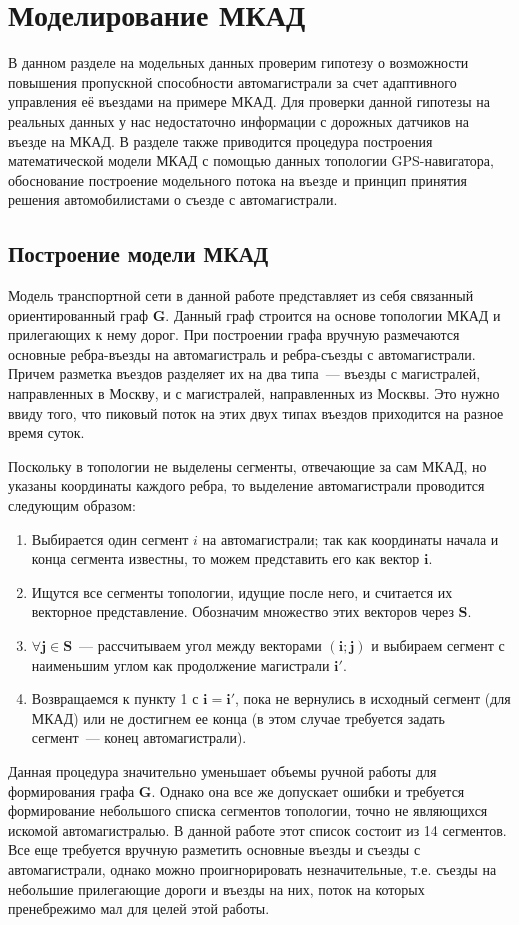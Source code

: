 \chapter{Моделирование МКАД}\label{sec:ch5}
В данном разделе на модельных данных проверим гипотезу о возможности повышения пропускной способности автомагистрали за счет адаптивного управления её въездами на примере МКАД.
Для проверки данной гипотезы на реальных данных у нас недостаточно информации с дорожных датчиков на въезде на МКАД.
В разделе также приводится процедура построения математической модели МКАД с помощью данных топологии GPS-навигатора, обоснование построение модельного потока на въезде и принцип принятия решения автомобилистами о съезде с автомагистрали.

\section{Построение модели МКАД}
\label{sec:MCAR_model}
Модель транспортной сети в данной работе представляет из себя связанный ориентированный граф \(\mathbf{G}\).
Данный граф строится на основе топологии МКАД и прилегающих к нему дорог.
При построении графа вручную размечаются основные ребра-въезды на автомагистраль и ребра-съезды с автомагистрали.
Причем разметка въездов разделяет их на два типа~--- въезды с магистралей, направленных в Москву, и с магистралей, направленных из Москвы.
Это нужно ввиду того, что пиковый поток на этих двух типах въездов приходится на разное время суток.

Поскольку в топологии не выделены сегменты, отвечающие за сам МКАД, но указаны координаты каждого ребра, то выделение автомагистрали проводится следующим образом:
\begin{enumerate}
  \item Выбирается один сегмент \(i\) на автомагистрали; так как координаты начала и конца сегмента известны, то можем представить его как вектор \(\mathbf{i}\).
  \item Ищутся все сегменты топологии, идущие после него, и считается их векторное представление. Обозначим множество этих векторов через \(\mathbf{S}\).
  \item \(\forall \mathbf{j} \in \mathbf{S}\)~--- рассчитываем угол между векторами \((\mathbf{i}; \mathbf{j})\) и выбираем сегмент с наименьшим углом как продолжение магистрали \(\mathbf{i'}\).
  \item Возвращаемся к пункту 1 с \(\mathbf{i} = \mathbf{i'}\), пока не вернулись в исходный сегмент (для МКАД) или не достигнем ее конца (в этом случае требуется задать сегмент~--- конец автомагистрали).
\end{enumerate}
Данная процедура значительно уменьшает объемы ручной работы для формирования графа \(\mathbf{G}\).
Однако она все же допускает ошибки и требуется формирование небольшого списка сегментов топологии, точно не являющихся искомой автомагистралью.
В данной работе этот список состоит из 14 сегментов.
Все еще требуется вручную разметить основные въезды и съезды с автомагистрали, однако можно проигнорировать незначительные, т.е. съезды на небольшие прилегающие дороги и въезды на них, поток на которых пренебрежимо мал для целей этой работы.

